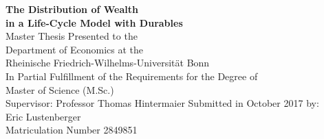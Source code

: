 \documentclass[a4paper,12pt]{article}
\begin{document}



\begin{titlepage}       %

\thispagestyle{empty}   %


\begin{center}
\vspace*{0.5cm}
{\bf  \Large The Distribution of Wealth \\in a Life-Cycle Model with Durables} \\
\vspace*{5cm} 
Master Thesis Presented to the \\ Department of Economics at the\\ Rheinische Friedrich-Wilhelms-Universit\"at Bonn
\\
\vspace*{1.5cm} 
In Partial Fulfillment of the Requirements for the Degree of \\ Master of Science (M.Sc.)\\
\vspace*{8cm} 
Supervisor: Professor Thomas Hintermaier  
\vfill
Submitted in October 2017 by:\\
Eric Lustenberger \\
Matriculation Number 2849851
\end{center}





% 
% 
% 

\end{titlepage}

\newpage                %





% 
% 


\end{document}
